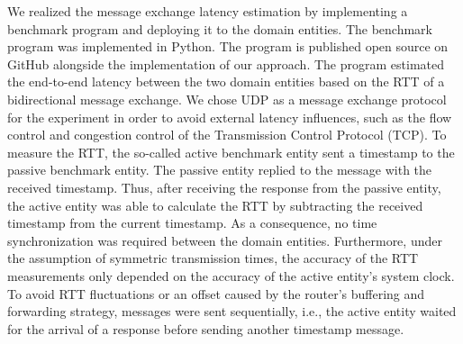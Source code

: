 We realized the message exchange latency estimation by implementing a benchmark program and deploying it to the domain entities.
The benchmark program was implemented in Python.
The program is published open source on GitHub \cite{gitcasc} alongside the implementation of our approach.
The program estimated the end-to-end latency between the two domain entities based on the RTT of a bidirectional message exchange.
We chose UDP as a message exchange protocol for the experiment in order to avoid external latency influences, such as the flow control and congestion control of the Transmission Control Protocol (TCP).
To measure the RTT, the so-called active benchmark entity sent a timestamp to the passive benchmark entity.
The passive entity replied to the message with the received timestamp.
Thus, after receiving the response from the passive entity, the active entity was able to calculate the RTT by subtracting the received timestamp from the current timestamp.
As a consequence, no time synchronization was required between the domain entities.
Furthermore, under the assumption of symmetric transmission times, the accuracy of the RTT measurements only depended on the accuracy of the active entity's system clock.
To avoid RTT fluctuations or an offset caused by the router's buffering and forwarding strategy, messages were sent sequentially, i.e., the active entity waited for the arrival of a response before sending another timestamp message.

